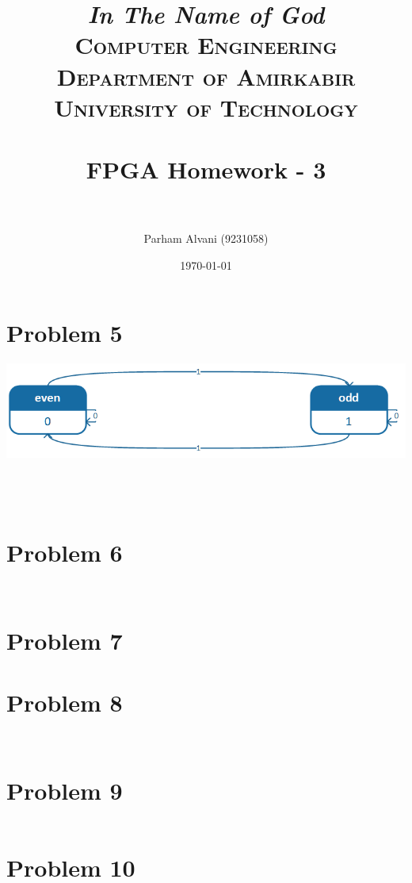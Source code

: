 \documentclass[paper=a4, fontsize=11pt]{scrartcl} %
\title{
\normalfont \normalsize
\textit{In The Name of God} \\
\textsc{Computer Engineering Department of Amirkabir University of Technology} \\ [25pt]
\horrule{0.5pt} \\[0.4cm] %
\huge FPGA Homework - 3 \\ %
\horrule{2pt} \\[0.5cm] %
}
\author{Parham Alvani (9231058)}
\date{\normalsize\today}
\numberwithin{equation}{section} %
\numberwithin{figure}{section} %
\numberwithin{table}{section} %
\begin{document}
\maketitle


\section{Problem 5}
\center\includegraphics[]{p5.png}
\inputminted{vhdl}{src/p5/parity-generator.vhd}
\inputminted{vhdl}{src/p5/shift-register.vhd}
\inputminted{vhdl}{src/p5/p5_t.vhd}
\inputminted{vhdl}{src/p5/p5.vhd}


\section{Problem 6}
\inputminted{vhdl}{src/p6/p6-2.vhd}
\inputminted{vhdl}{src/p6/p6-3.vhd}


\section{Problem 7}


\section{Problem 8}
\inputminted{vhdl}{src/p8/p8.vhd}
\inputminted{vhdl}{src/p8/p8_t.vhd}


\section{Problem 9}
\inputminted{vhdl}{src/p9/p9.vhd}


\section{Problem 10}
\inputminted{vhdl}{src/p10/p10.vhd}
\end{document}
